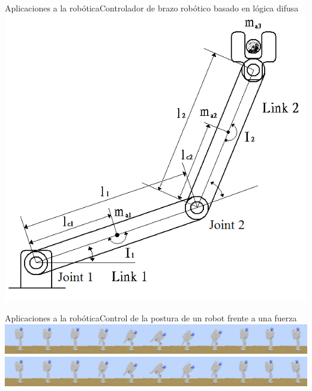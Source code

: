 \documentclass{beamer}
\begin{document}
\begin{frame}
\frametitle{}

\end{frame}
\begin{frame}{Aplicaciones a la robótica}{Controlador de brazo robótico basado
en lógica difusa}
	\centering
	\includegraphics[scale=0.3]{arm}
\end{frame}
\begin{frame}{Aplicaciones a la robótica}{Control de la postura de un robot
frente a una fuerza}
	\centering
	\includegraphics[width=\textwidth]{humanoid1}
\\
	\includegraphics[width=\textwidth]{humanoid2}
\end{frame}
\end{document}
